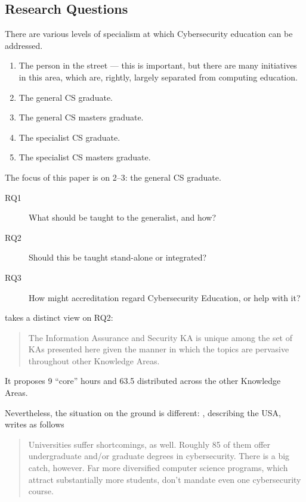 \documentclass[conference]{IEEEtran}
\begin{document}
\subsection{Research Questions}
There are various levels of specialism at which Cybersecurity education can be addressed.
\begin{enumerate}
\item The person in the street --- this is important, but there are many initiatives in this area, which are, rightly, largely separated from computing education.
\item The general CS graduate.
\item The general CS masters graduate.
\item The specialist CS graduate.
\item The specialist CS masters graduate.
\end{enumerate}
The focus of this paper is on 2--3: the general CS graduate.
\begin{description}
\item[RQ1]What should be taught to the generalist, and how?
\item[RQ2]Should this be taught stand-alone or integrated? 
\item[RQ3]How might accreditation regard Cybersecurity Education, or help with it?
\end{description}
\cite[p.~97]{ACM2013a} takes a distinct view on RQ2:
\begin{quote}
The Information Assurance and Security KA is unique among the set of KAs presented here
given the manner in which the topics are pervasive throughout other Knowledge Areas.
\end{quote}
It proposes 9 ``core'' hours and 63.5 distributed across the other Knowledge Areas.
\par
Nevertheless, the situation on the ground is different: \cite{Ackerman2019a}, describing the USA, writes as follows
\begin{quote}
Universities suffer shortcomings, as well. Roughly 85 of them offer undergraduate and/or graduate degrees in cybersecurity. There is a big catch, however. Far more diversified computer science programs, which attract substantially more students, don't mandate even one cybersecurity course.
\end{quote}
\end{document}
